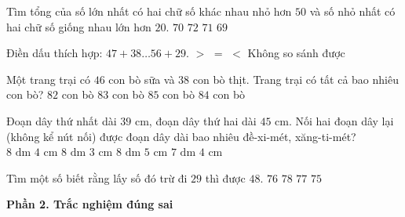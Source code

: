 \begin{ex} %
Tìm tổng của số lớn nhất có hai chữ số khác nhau nhỏ hơn $50$ và số nhỏ nhất có hai chữ số giống nhau lớn hơn $20$.
\choice
{$70$}
{$72$}
{\True $71$}
{$69$}
\end{ex}

\begin{ex} %
Điền dấu thích hợp: $47 + 38 \dots 56 + 29$.
\choice
{$>$}
{\True $=$}
{$<$}
{Không so sánh được}
\end{ex}

\begin{ex} %
Một trang trại có $46$ con bò sữa và $38$ con bò thịt. Trang trại có tất cả bao nhiêu con bò?
\choice
{$82$ con bò}
{$83$ con bò}
{$85$ con bò}
{\True $84$ con bò}
\end{ex}

\begin{ex} %
Đoạn dây thứ nhất dài $39\text{ cm}$, đoạn dây thứ hai dài $45\text{ cm}$. Nối hai đoạn dây lại (không kể nút nối) được đoạn dây dài bao nhiêu đề-xi-mét, xăng-ti-mét?
\choice
{\True $8\text{ dm } 4\text{ cm}$}
{$8\text{ dm } 3\text{ cm}$}
{$8\text{ dm } 5\text{ cm}$}
{$7\text{ dm } 4\text{ cm}$}
\end{ex}

\begin{ex} %
Tìm một số biết rằng lấy số đó trừ đi $29$ thì được $48$.
\choice
{$76$}
{$78$}
{\True $77$}
{$75$}
\end{ex}

\textbf{Phần 2. Trắc nghiệm đúng sai}

